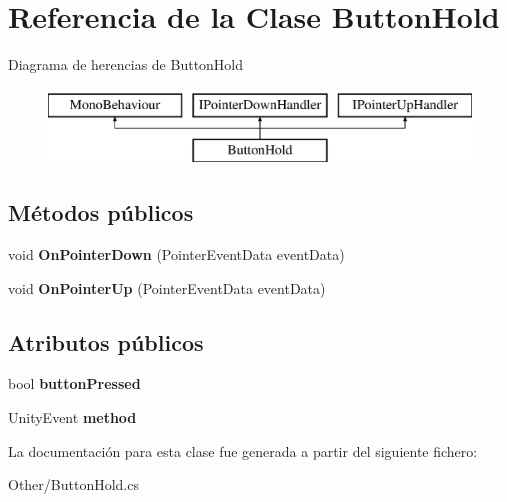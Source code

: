 \hypertarget{class_button_hold}{}\section{Referencia de la Clase Button\+Hold}
\label{class_button_hold}
Diagrama de herencias de Button\+Hold\begin{figure}[H]
\begin{center}
\leavevmode
\includegraphics[height=2.000000cm]{class_button_hold}
\end{center}
\end{figure}
\subsection*{Métodos públicos}
\begin{DoxyCompactItemize}
\item 
\mbox{\label{class_button_hold_a2e1f8ebf88714ea3e86261ef811c9941}} 
void {\bfseries On\+Pointer\+Down} (Pointer\+Event\+Data event\+Data)
\item 
\mbox{\label{class_button_hold_a2512c68bf1ec55d4bae22da5ef7ed66a}} 
void {\bfseries On\+Pointer\+Up} (Pointer\+Event\+Data event\+Data)
\end{DoxyCompactItemize}
\subsection*{Atributos públicos}
\begin{DoxyCompactItemize}
\item 
\mbox{\label{class_button_hold_a9855cab98cfb77aee35a1cf117be20ef}} 
bool {\bfseries button\+Pressed}
\item 
\mbox{\label{class_button_hold_a45f8cc4d6c22a20d71717b00d3087fd4}} 
Unity\+Event {\bfseries method}
\end{DoxyCompactItemize}


La documentación para esta clase fue generada a partir del siguiente fichero\+:\begin{DoxyCompactItemize}
\item 
Other/Button\+Hold.\+cs\end{DoxyCompactItemize}
